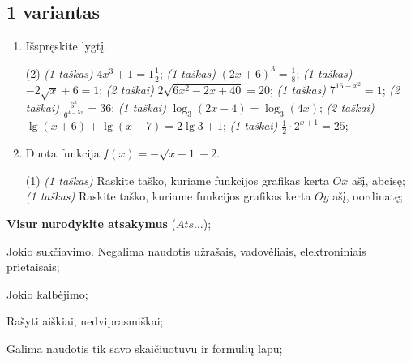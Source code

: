 \documentclass[a4paper]{article}
\begin{document}
\vspace*{12mm}
\subsection*{1 variantas}

\begin{enumerate}
      \item Išspręskite lygtį.

            \begin{tasks}[item-format={\normalfont}, after-item-skip=2mm](2)
                  \task \textit{(1 taškas)} $4x^3+1=1\frac{1}{2}$;
                  \task \textit{(1 taškas)} $(2x+6)^3=\frac{1}{8}$;
                  \task \textit{(1 taškas)} $-2\sqrt{x}+6=1$;
                  \task \textit{(2 taškai)} $2\sqrt{6x^2-2x+40}=20$;
                  \task \textit{(1 taškas)} $7^{16-x^2}=1$;
                  \task \textit{(2 taškai)} $\frac{6^x}{6^{4-5x}}=36$;
                  \task \textit{(1 taškai)} $\log_3(2x-4)=\log_3(4x)$;
                  \task \textit{(2 taškai)} $\lg(x+6)+\lg(x+7)=2\lg3+1$;
                  \task \textit{(1 taškai)} $\frac{1}{2}\cdot 2^{x+1}=25$;
            \end{tasks}

      \item Duota funkcija $f(x)=-\sqrt{x+1}-2$.
            \begin{tasks}[item-format={\normalfont}, after-item-skip=2mm](1)
                  \task \textit{(1 taškas)} Raskite taško, kuriame funkcijos grafikas kerta $Ox$ ašį, abcisę;
                  \task \textit{(1 taškas)} Raskite taško, kuriame funkcijos grafikas kerta $Oy$ ašį, oordinatę;
            \end{tasks}
\end{enumerate}

\begin{small}
      \begin{enumerate*}[label={(\arabic*)}]
            \item \textbf{Visur} \textbf{nurodykite atsakymus} ($Ats\ldots$);
            \item Jokio sukčiavimo. Negalima naudotis užrašais, vadovėliais,
            elektroniniais prietaisais;
            \item Jokio kalbėjimo;
            \item Rašyti aiškiai, nedviprasmiškai;
            \item Galima naudotis tik savo skaičiuotuvu ir formulių lapu;
      \end{enumerate*}
\end{small}
\end{document}
